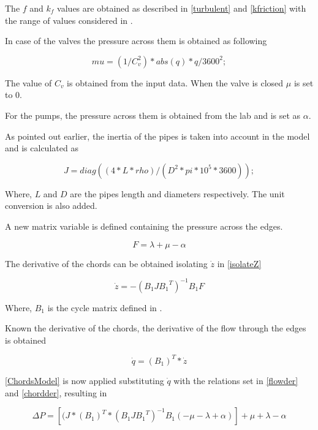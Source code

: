 The $f$ and $k_f$ values are obtained as described in \eqref{turbulent} and \eqref{kfriction} with the range of values considered in .

In case of the valves the pressure across them is obtained as following

\begin{equation}
  mu = (1/C_v^2)* abs(q)*q /3600^2;
\end{equation}

The value of $C_v$ is obtained from the input data. When the valve is closed $\mu$ is set to 0. 

For the pumps, the pressure across them is obtained from the lab and is set as $\alpha$. 

As pointed out earlier, the inertia of the pipes is taken into account in the model and is calculated as

\begin{equation}
  J = diag((4*L*rho)/(D^2*pi*10^5*3600));
\end{equation}

Where, $L$ and $D$ are the pipes length and diameters respectively. The unit conversion is also added. 

A new matrix variable is defined containing the pressure across the edges.

\begin{equation}
  F = \lambda + \mu - \alpha
\end{equation}

The derivative of the chords can be obtained isolating $\dot{z}$ in \eqref{isolateZ}

\begin{equation}
  \dot{z}  =  - (B_1 J {B_1}^T)^{-1}B_1 F
  \label{chordder}
\end{equation}

Where, $B_1$ is the cycle matrix defined in . 

Known the derivative of the chords, the derivative of the flow through the edges is obtained

\begin{equation}
  \dot{q}  = (B_1)^T * \dot{z}
  \label{flowder}
\end{equation}

\eqref{ChordsModel} is now applied substituting $\dot{q}$ with the relations set in \eqref{flowder} and \eqref{chordder}, resulting in

\begin{equation}
  \Delta P = [(J*(B_1)^T * (B_1 J {B_1}^T)^{-1}B_1 (-\mu - \lambda + \alpha)]+\mu+\lambda-\alpha
  \label{DeltaP}
\end{equation}

